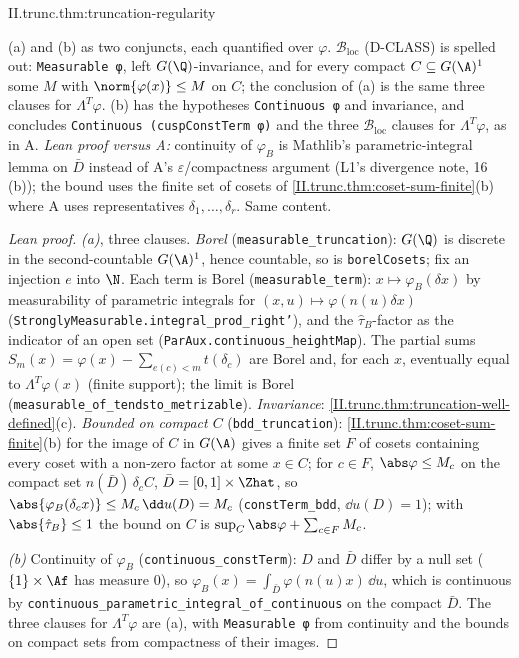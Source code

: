 \begin{tfformal}{II.trunc.thm:truncation-regularity}
\begin{tffidelity}
(a) and (b) as two conjuncts, each quantified over $\varphi$. $\mathcal B_{\mathrm{loc}}$ (D-CLASS) is spelled out: \texttt{Measurable φ}, left $G(\Q)$-invariance, and for every compact $C\subseteq G(\A)^1$ some $M$ with $\norm{\varphi(x)}\le M$ on $C$; the conclusion of (a) is the same three clauses for $\Lambda^T\varphi$. (b) has the hypotheses \texttt{Continuous φ} and invariance, and concludes \texttt{Continuous (cuspConstTerm φ)} and the three $\mathcal B_{\mathrm{loc}}$ clauses for $\Lambda^T\varphi$, as in A. \emph{Lean proof versus A:} continuity of $\varphi_B$ is Mathlib's parametric-integral lemma on $\bar D$ instead of A's $\varepsilon$/compactness argument (L1's divergence note, 16 (b)); the bound uses the finite set of cosets of \cref{II.trunc.thm:coset-sum-finite}(b) where A uses representatives $\delta_1,\dots,\delta_r$. Same content.
\end{tffidelity}
\end{tfformal}
\begin{proof}[Lean proof]
\emph{(a)}, three clauses. \emph{Borel} (\texttt{measurable\_truncation}): $G(\Q)$ is discrete in the second-countable $G(\A)^1$, hence countable, so is \texttt{borelCosets}; fix an injection $e$ into $\N$. Each term is Borel (\texttt{measurable\_term}): $x\mapsto\varphi_B(\delta x)$ by measurability of parametric integrals for $(x,u)\mapsto\varphi(n(u)\delta x)$ (\texttt{StronglyMeasurable.integral\_prod\_right'}), and the $\hat\tau_B$-factor as the indicator of an open set (\texttt{ParAux.continuous\_heightMap}). The partial sums $S_m(x)=\varphi(x)-\sum_{e(c)<m}t(\delta_c)$ are Borel and, for each $x$, eventually equal to $\Lambda^T\varphi(x)$ (finite support); the limit is Borel (\texttt{measurable\_of\_tendsto\_metrizable}). \emph{Invariance}: \cref{II.trunc.thm:truncation-well-defined}(c). \emph{Bounded on compact $C$} (\texttt{bdd\_truncation}): \cref{II.trunc.thm:coset-sum-finite}(b) for the image of $C$ in $G(\A)$ gives a finite set $F$ of cosets containing every coset with a non-zero factor at some $x\in C$; for $c\in F$, $\abs\varphi\le M_c$ on the compact set $n(\bar D)\,\delta_cC$, $\bar D=[0,1]\times\Zhat$, so $\abs{\varphi_B(\delta_cx)}\le M_c\,\dd u(D)=M_c$ (\texttt{constTerm\_bdd}, $\dd u(D)=1$); with $\abs{\hat\tau_B}\le1$ the bound on $C$ is $\sup_C\abs\varphi+\sum_{c\in F}M_c$.

\emph{(b)} Continuity of $\varphi_B$ (\texttt{continuous\_constTerm}): $D$ and $\bar D$ differ by a null set ($\{1\}\times\Af$ has measure $0$), so $\varphi_B(x)=\int_{\bar D}\varphi(n(u)x)\,\dd u$, which is continuous by \texttt{continuous\_parametric\_integral\_of\_continuous} on the compact $\bar D$. The three clauses for $\Lambda^T\varphi$ are (a), with \texttt{Measurable φ} from continuity and the bounds on compact sets from compactness of their images.
\end{proof}

